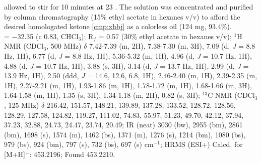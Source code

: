 allowed to stir for 10 minutes at 23 \degc. The solution was concentrated and purified by column
chromatography (15\% ethyl acetate in hexanes v/v) to afford the desired homologated ketone
\ref{cmp:xbbj} as a colorless oil (124 mg, 93.4\%).\\
\rotation = $-$32.35 (c 0.83, CHCl$_3$); R$_f$ = 0.57 (30\% ethyl acetate in hexanes v/v); $^1$H NMR (CDCl$_3$,
500 MHz) $\delta$ 7.42-7.39 (m, 2H), 7.38-7.30 (m, 3H), 7.09 (d, \textit{J} = 8.8 Hz, 1H), 6.77 (d, \textit{J} = 8.8 Hz,
1H), 5.36-5.32 (m, 1H), 4.96 (d, \textit{J} = 10.7 Hz, 1H), 4.88 (d, \textit{J} = 10.7 Hz, 1H), 3.88 (s, 3H), 3.14
(d, \textit{J} = 13.7 Hz, 1H), 2.99 (d, \textit{J} = 13.9 Hz, 1H), 2.50 (ddd, \textit{J} = 14.6, 12.6, 6.8, 1H), 2.46-2.40 (m,
1H), 2.39-2.35 (m, 1H), 2.27-2.21 (m, 1H), 1.93-1.86 (m, 1H), 1.78-1.72 (m, 1H), 1.68-1.66 (m,
3H), 1.64-1.58 (m, 1H), 1.35 (s, 3H), 1.34-1.18 (m, 2H), 0.82 (s, 3H); $^{13}$C NMR (CDCl$_3$, 125
MHz) $\delta$ 216.42, 151.57, 148.21, 139.89, 137.28, 133.52, 128.72, 128.56, 128.29, 127.58, 124.82,
119.27, 111.02, 74.83, 55.97, 51.23, 49.70, 42.12, 37.94, 37.23, 32.88, 24.73, 24.47, 23.74,
20.49; IR (neat) 3030 (bw), 2955 (bm), 2861 (bm), 1698 (s), 1574 (m), 1462 (bs), 1371 (m), 1276
(s), 1214 (bm), 1080 (bs), 979 (bs), 924 (bm), 797 (s), 732 (bs), 697 (s) cm$^{-1}$; HRMS (ESI+)
Calcd. for  [M+H]$^+$: 453.2196; Found 453.2210.

